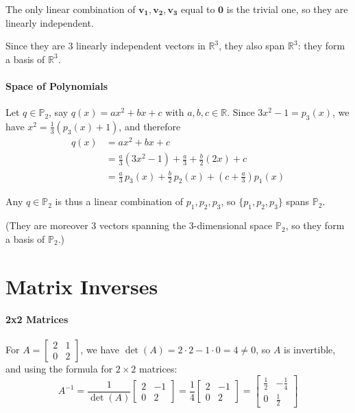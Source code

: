 \documentclass[]{article}
\newcommand{\R}{\mathbb{R}}
\newcommand{\Primes}{\mathbb{P}}
\begin{document}
	The only linear combination of $\mathbf{v_1}, \mathbf{v_2}, \mathbf{v_3}$ equal to $\mathbf{0}$ is the trivial one, so they are linearly independent.

	Since they are $3$ linearly independent vectors in $\R^3$, they also span $\R^3$: they form a basis of $\R^3$.

	\paragraph{Space of Polynomials}\mbox{}

	Let $q \in \Primes_2$, say $q(x) = a x^2 + b x + c$ with $a, b, c \in \R$. Since $3x^2 - 1 = p_3(x)$, we have $x^2 = \frac{1}{3}\left(p_3(x) + 1\right)$, and therefore
	\begin{align*}
		q(x) &= a x^2 + b x + c \\
		     &= \frac{a}{3}\left(3x^2 - 1\right) + \frac{a}{3} + \frac{b}{2}\left(2x\right) + c \\
		     &= \frac{a}{3} \, p_3(x) + \frac{b}{2} \, p_2(x) + \left(c + \frac{a}{3}\right) p_1(x)
	\end{align*}

	Any $q \in \Primes_2$ is thus a linear combination of $p_1, p_2, p_3$, so $\{p_1, p_2, p_3\}$ spans $\Primes_2$.

	(They are moreover $3$ vectors spanning the $3$-dimensional space $\Primes_2$, so they form a basis of $\Primes_2$.)


	\section{Matrix Inverses}
	\paragraph{2x2 Matrices}\mbox{}

	For $A = \begin{bmatrix} 2 & 1 \\ 0 & 2 \end{bmatrix}$, we have $\det(A) = 2 \cdot 2 - 1 \cdot 0 = 4 \neq 0$, so $A$ is invertible, and using the formula for $2 \times 2$ matrices:
	$$A^{-1} = \frac{1}{\det(A)} \begin{bmatrix} 2 & -1 \\ 0 & 2 \end{bmatrix} = \frac{1}{4} \begin{bmatrix} 2 & -1 \\ 0 & 2 \end{bmatrix} = \begin{bmatrix} \frac{1}{2} & -\frac{1}{4} \\ 0 & \frac{1}{2} \end{bmatrix}$$
\end{document}
